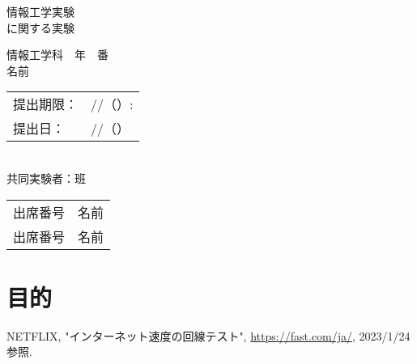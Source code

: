 \documentclass[titlepage]{ltjsreport}
\begin{document}
\makeatletter
\let\c@lstlisting=\c@figure
\makeatother
\begin{titlepage}
\vspace*{1em}
\begin{center}
\begin{huge}
情報工学実験
\\
\vspace{1em}
に関する実験
\end{huge}
\end{center}
\vspace{6em}
\begin{flushright}
\begin{LARGE}
情報工学科　年　番
\\
\vspace{1em}
名前
\end{LARGE}
\end{flushright}
\vspace{4em}
\begin{flushleft}
\begin{Large}
\begin{tabular}{ll}
提出期限： & //（）:
\\
提出日： & //（）
\\
\end{tabular}
\\
\vspace{2em}
共同実験者：班
\\
\vspace{1em}
\begin{tabular}{ll}
出席番号 & 名前
\\
出席番号 & 名前
\\
\end{tabular}
\end{Large}
\end{flushleft}
\end{titlepage}
\begin{abstract}
\end{abstract}
\chapter{目的}
\begin{thebibliography}{99}
 NETFLIX, "インターネット速度の回線テスト", \url{https://fast.com/ja/}, 2023/1/24参照.
\end{thebibliography}
\end{document}
